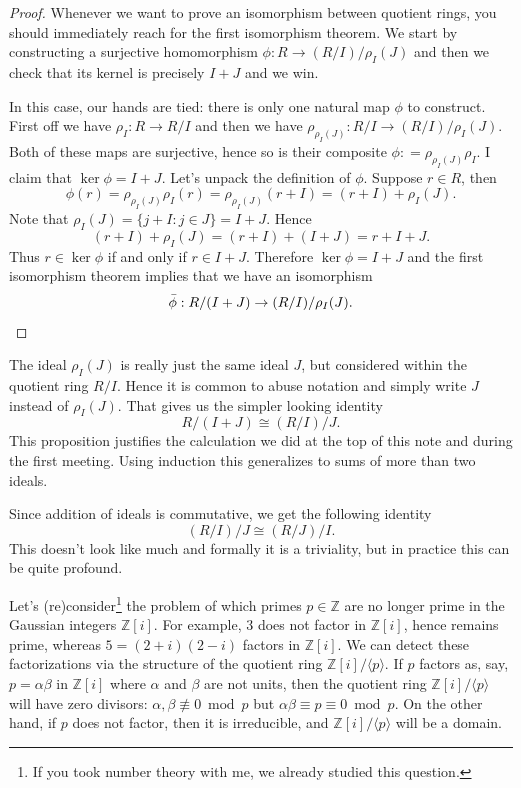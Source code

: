 \documentclass[11pt]{article}
\def\ZZ{\mathbb{Z}}
\theoremstyle{definition}
\numberwithin{equation}{subsection}
\begin{document}
\begin{proof}
    Whenever we want to prove an isomorphism between quotient rings, you should immediately reach for the first isomorphism theorem.
    We start by constructing a surjective homomorphism $\phi : R \to (R/I)/\rho_I(J)$ and then we check that its kernel is precisely $I + J$ and we win.

    In this case, our hands are tied: there is only one natural map $\phi$ to construct.
    First off we have $\rho_I : R \to R/I$ and then we have $\rho_{\rho_I(J)} : R/I \to (R/I)/\rho_I(J)$.
    Both of these maps are surjective, hence so is their composite $\phi : = \rho_{\rho_I(J)}\rho_I$.
    I claim that $\ker\phi = I + J$.
    Let's unpack the definition of $\phi$.
    Suppose $r \in R$, then
    \[
        \phi(r) = \rho_{\rho_I(J)}\rho_I(r)
        = \rho_{\rho_I(J)}(r + I)
        = (r + I) + \rho_I(J).
    \]
    Note that $\rho_I(J) = \{j + I : j \in J\} = I + J$.
    Hence
    \[
        (r + I) + \rho_I(J) = (r + I) + (I + J) = r + I + J.
    \]
    Thus $r \in \ker\phi$ if and only if $r \in I + J$.
    Therefore $\ker\phi = I + J$ and the first isomorphism theorem implies that we have an isomorphism
    \[
        \bar\phi : R/(I + J) \to (R/I)/\rho_I(J).\qedhere
    \]
\end{proof}

The ideal $\rho_I(J)$ is really just the same ideal $J$, but considered within the quotient ring $R/I$.
Hence it is common to abuse notation and simply write $J$ instead of $\rho_I(J)$.
That gives us the simpler looking identity
\[
    R/(I + J) \cong (R/I)/J.
\]
This proposition justifies the calculation we did at the top of this note and during the first meeting.
Using induction this generalizes to sums of more than two ideals.

Since addition of ideals is commutative, we get the following identity
\[
    (R/I)/J \cong (R/J)/I.
\]
This doesn't look like much and formally it is a triviality, but in practice this can be quite profound.

Let's (re)consider\footnote{If you took number theory with me, we already studied this question.} the problem of which primes $p \in \ZZ$ are no longer prime in the Gaussian integers $\ZZ[i]$.
For example, $3$ does not factor in $\ZZ[i]$, hence remains prime, whereas $5 = (2 + i)(2 - i)$ factors in $\ZZ[i]$.
We can detect these factorizations via the structure of the quotient ring $\ZZ[i]/\langle p\rangle$.
If $p$ factors as, say, $p = \alpha \beta$ in $\ZZ[i]$ where $\alpha$ and $\beta$ are not units, then the quotient ring $\ZZ[i]/\langle p\rangle$ will have zero divisors: $\alpha, \beta \not\equiv 0 \bmod p$ but $\alpha\beta \equiv p \equiv 0 \bmod p$.
On the other hand, if $p$ does not factor, then it is irreducible, and $\ZZ[i]/\langle p \rangle$ will be a domain.
\end{document}
